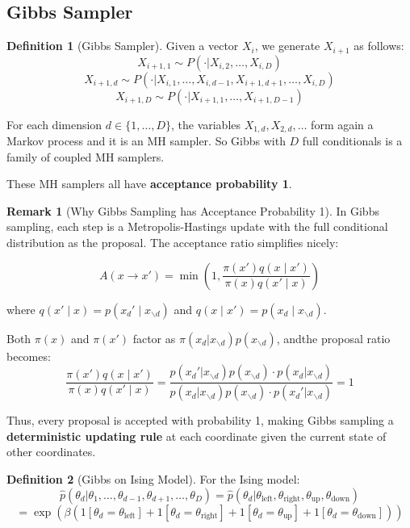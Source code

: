\documentclass[12pt,a4paper]{article}
\theoremstyle{definition}
\newtheorem{definition}{Definition}[section]
\newtheorem{remark}{Remark}[section]
\begin{document}
\subsection{Gibbs Sampler}

\begin{definition}[Gibbs Sampler]
Given a vector $X_i$, we generate $X_{i+1}$ as follows:
\[
X_{i+1,1} \sim P(\cdot | X_{i,2}, \ldots, X_{i,D})
\]
\[
X_{i+1,d} \sim P(\cdot | X_{i,1}, \ldots, X_{i,d-1}, X_{i+1,d+1}, \ldots, X_{i,D})
\]
\[
X_{i+1,D} \sim P(\cdot | X_{i+1,1}, \ldots, X_{i+1,D-1})
\]

For each dimension $d \in \{1, \ldots, D\}$, the variables $X_{1,d}, X_{2,d}, \ldots$ form again a Markov process and it is an MH sampler. So Gibbs with $D$ full conditionals is a family of coupled MH samplers.

These MH samplers all have \textbf{acceptance probability 1}.
\end{definition}

\begin{remark}[Why Gibbs Sampling has Acceptance Probability 1]
In Gibbs sampling, each step is a Metropolis-Hastings update with the full conditional distribution as the proposal. The acceptance ratio simplifies nicely:

\[
A(x \to x') = \min\left(1, \frac{\pi(x') q(x \mid x')}{\pi(x) q(x' \mid x)}\right)
\]

where $q(x' \mid x) = p(x_d' \mid x_{\backslash d})$ and $q(x \mid x') = p(x_d \mid x_{\backslash d})$. 

Both $\pi(x)$ and $\pi(x')$ factor as $\pi(x_d | x_{\backslash d}) p(x_{\backslash d})$, andthe proposal ratio becomes:
\[
\frac{\pi(x') q(x \mid x')}{\pi(x) q(x' \mid x)} = \frac{p(x_d' | x_{\backslash d}) p(x_{\backslash d}) \cdot p(x_d | x_{\backslash d})}{p(x_d | x_{\backslash d}) p(x_{\backslash d}) \cdot p(x_d' | x_{\backslash d})} = 1
\]

Thus, every proposal is accepted with probability 1, making Gibbs sampling a \textbf{deterministic updating rule} at each coordinate given the current state of other coordinates.
\end{remark}

\begin{definition}[Gibbs on Ising Model]
For the Ising model:
\[
\hat{p}(\theta_d | \theta_1, \ldots, \theta_{d-1}, \theta_{d+1}, \ldots, \theta_D) = \hat{p}(\theta_d | \theta_{\text{left}}, \theta_{\text{right}}, \theta_{\text{up}}, \theta_{\text{down}})
\]
\[
= \exp\left(\beta\left(1[\theta_d = \theta_{\text{left}}] + 1[\theta_d = \theta_{\text{right}}] + 1[\theta_d = \theta_{\text{up}}] + 1[\theta_d = \theta_{\text{down}}]\right)\right)
\]
\end{definition}
\end{document}
